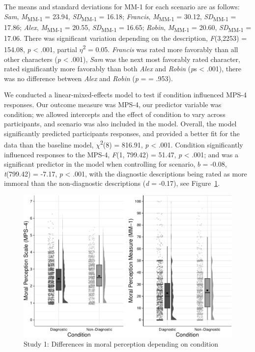 \documentclass[
  man,floatsintext]{apa7}
\begin{document}
The means and standard deviations for MM-1 for each scenario are as follows:
\emph{Sam},
\emph{M}\textsubscript{MM-1} = 23.94, \emph{SD}\textsubscript{MM-1} = 16.18;
\emph{Francis},
\emph{M}\textsubscript{MM-1} = 30.12, \emph{SD}\textsubscript{MM-1} = 17.86;
\emph{Alex},
\emph{M}\textsubscript{MM-1} = 20.55, \emph{SD}\textsubscript{MM-1} = 16.65;
\emph{Robin},
\emph{M}\textsubscript{MM-1} = 20.60, \emph{SD}\textsubscript{MM-1} = 17.06. There was significant variation depending on the description, \emph{F}(3,2253) = 154.08, \emph{p} \textless{} .001, partial \(\eta\)\textsuperscript{2} = 0.05. \emph{Francis} was rated more favorably than all other characters (\emph{p} \textless{} .001), \emph{Sam} was the next most favorably rated character, rated significantly more favorably than both \emph{Alex} and \emph{Robin} (\emph{p}s \textless{} .001), there was no difference between \emph{Alex} and \emph{Robin} (\emph{p} = = .953).

We conducted a linear-mixed-effects model to test if condition influenced MPS-4 responses. Our outcome measure was MPS-4, our predictor variable was condition; we allowed intercepts and the effect of condition to vary across participants, and scenario was also included in the model.
Overall, the model significantly predicted participants responses, and provided a better fit for the data than the baseline model, \(\chi\)\textsuperscript{2}(8) = 816.91, \emph{p} \textless{} .001. Condition significantly influenced responses to the MPS-4, \emph{F}(1, 799.42) = 51.47, \emph{p} \textless{} .001; and was a significant predictor in the model when controlling for scenario, \(b\) = -0.08, \emph{t}(799.42) = -7.17, \emph{p} \textless{} .001, with the diagnostic descriptions being rated as more immoral than the non-diagnostic descriptions (\emph{d} = -0.17), see Figure~\ref{fig:S1bothconditionplot}.

\begin{figure}
\centering
\includegraphics{moral_dilution_in_chunks_files/figure-latex/S1bothconditionplot-1.pdf}
\caption{\label{fig:S1bothconditionplot}Study 1: Differences in moral perception depending on condition}
\end{figure}
\end{document}
